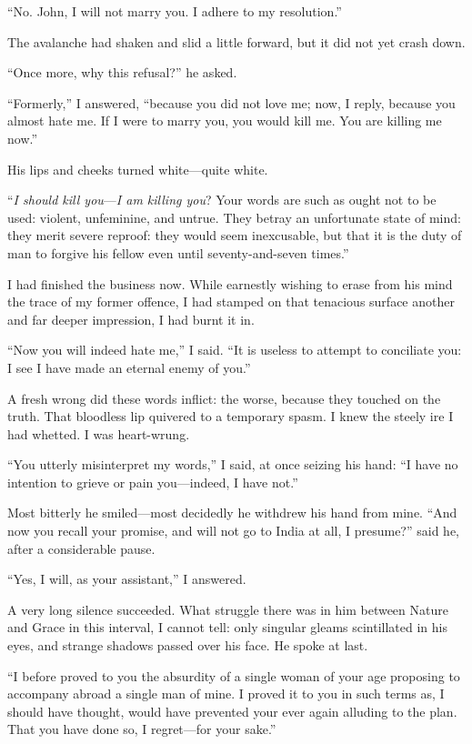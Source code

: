 \enquote{No. \St{} John, I will not marry you. I adhere to my
resolution.}

The avalanche had shaken and slid a little forward, but it did not yet
crash down.

\enquote{Once more, why this refusal?} he asked.

\enquote{Formerly,} I answered, \enquote{because you did not love me;
now, I reply, because you almost hate me. If I were to marry you, you
would kill me. You are killing me now.}

His lips and cheeks turned white---quite white.

\enquote{\emph{I should kill you}---\emph{I am killing you}? Your words are
such as ought not to be used: violent, unfeminine, and untrue. They
betray an unfortunate state of mind: they merit severe reproof: they
would seem inexcusable, but that it is the duty of man to forgive his
fellow even until seventy-and-seven times.}

I had finished the business now. While earnestly wishing to erase from
his mind the trace of my former offence, I had stamped on that tenacious
surface another and far deeper impression, I had burnt it in.

\enquote{Now you will indeed hate me,} I said. \enquote{It is useless
to attempt to conciliate you: I see I have made an eternal enemy of
you.}

A fresh wrong did these words inflict: the worse, because they touched
on the truth. That bloodless lip quivered to a temporary spasm. I knew
the steely ire I had whetted. I was heart-wrung.

\enquote{You utterly misinterpret my words,} I said, at once seizing his
hand: \enquote{I have no intention to grieve or pain you---indeed, I
have not.}

Most bitterly he smiled---most decidedly he withdrew his hand from
mine. \enquote{And now you recall your promise, and will not go to
India at all, I presume?} said he, after a considerable pause.

\enquote{Yes, I will, as your assistant,} I answered.

A very long silence succeeded. What struggle there was in him between
Nature and Grace in this interval, I cannot tell: only singular gleams
scintillated in his eyes, and strange shadows passed over his face. He
spoke at last.

\enquote{I before proved to you the absurdity of a single woman of your
age proposing to accompany abroad a single man of mine. I proved it to
you in such terms as, I should have thought, would have prevented your
ever again alluding to the plan. That you have done so, I regret---for
your sake.}

